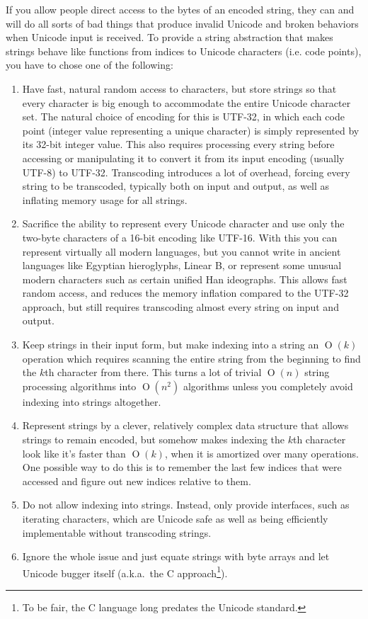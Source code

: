 \documentclass{article}
\renewcommand{\O}{\ensuremath{\operatorname{O}}}
\begin{document}
If you allow people direct access to the bytes of an encoded string, they can and will do all sorts of bad things that produce invalid Unicode and broken behaviors when Unicode input is received.
To provide a string abstraction that makes strings behave like functions from indices to Unicode characters (i.e. code points), you have to chose one of the following:
\begin{enumerate}

\item Have fast, natural random access to characters, but store strings so that every character is big enough to accommodate the entire Unicode character set.
The natural choice of encoding for this is UTF-32, in which each code point (integer value representing a unique character) is simply represented by its 32-bit integer value.
This also requires processing every string before accessing or manipulating it to convert it from its input encoding (usually UTF-8) to UTF-32.
Transcoding introduces a lot of overhead, forcing every string to be transcoded, typically both on input and output, as well as inflating memory usage for all strings.

\item Sacrifice the ability to represent every Unicode character and use only the two-byte characters of a 16-bit encoding like UTF-16.
With this you can represent virtually all modern languages, but you cannot write in ancient languages like Egyptian hieroglyphs, Linear B, or represent some unusual modern characters such as certain unified Han ideographs.
This allows fast random access, and reduces the memory inflation compared to the UTF-32 approach, but still requires transcoding almost every string on input and output.

\item Keep strings in their input form, but make indexing into a string an $\O(k)$ operation which requires scanning the entire string from the beginning to find the $k$th character from there.
This turns a lot of trivial $\O(n)$ string processing algorithms into $\O(n^2)$ algorithms unless you completely avoid indexing into strings altogether.

\item Represent strings by a clever, relatively complex data structure that allows strings to remain encoded, but somehow makes indexing the $k$th character look like it's faster than $\O(k)$, when it is amortized over many operations.
One possible way to do this is to remember the last few indices that were accessed and figure out new indices relative to them.

\item Do not allow indexing into strings. Instead, only provide interfaces, such as iterating characters, which are Unicode safe as well as being efficiently implementable without transcoding strings.

\item Ignore the whole issue and just equate strings with byte arrays and let Unicode bugger itself (a.k.a.~the C approach\footnote{To be fair, the C language long predates the Unicode standard.}).

\end{enumerate}
\end{document}
